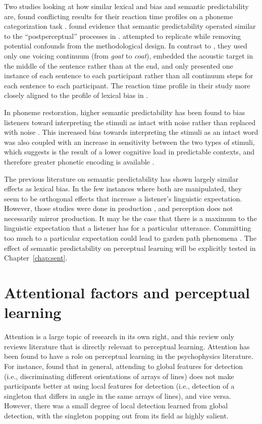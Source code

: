 Two studies looking at how similar lexical and bias and semantic predictability are, found conflicting results for their reaction time profiles on a phoneme categorization task \citep{Connine1987,Borsky1998}.
\citet{Connine1987} found evidence that semantic predictability operated similar to the ``postperceptual'' processes in \citet{Connine1987a}.  
\citet{Borsky1998} attempted to replicate \citet{Connine1987} while removing potential confounds from the methodological design.  
In contrast to \citet{Connine1987}, they used only one voicing continuum (from \emph{goat} to \emph{coat}), embedded the acoustic target in the middle of the sentence rather than at the end, and only presented one instance of each sentence to each participant rather than all continuum steps for each sentence to each participant.  
The reaction time profile in their study more closely aligned to the profile of lexical bias in \citet{Connine1987a}.

In phoneme restoration, higher semantic predictability has been found to bias listeners toward interpreting the stimuli as intact with noise rather than replaced with noise \citep{Samuel1981}.
This increased bias towards interpreting the stimuli as an intact word was also coupled with an increase in sensitivity between the two types of stimuli, which \citet{Samuel1981} suggests is the result of a lower cognitive load in predictable contexts, and therefore greater phonetic encoding is available \citep[see also][]{Mattys2011}.

The previous literature on semantic predictability has shown largely similar effects as lexical bias.  
In the few instances where both are manipulated, they seem to be orthogonal effects that increase a listener's linguistic expectation.  
However, those studies were done in production \citep{Scarborough2010, Clopper2008}, and perception does not necessarily mirror production.  
It may be the case that there is a maximum to the linguistic expectation that a listener has for a particular utterance.  
Committing too much to a particular expectation could lead to garden path phenomena \citep{Levy2008}.  
The effect of semantic predictability on perceptual learning will be explicitly tested in Chapter~\ref{chap:sent}.

\section{Attentional factors and perceptual learning}
\label{sec:attention}

Attention is a large topic of research in its own right, and this review only reviews literature that is directly relevant to perceptual learning.
Attention has been found to have a role on perceptual learning in the psychophysics literature.  
For instance, \citet{Ahissar1993} found that in general, attending to global features for detection (i.e., discriminating different orientations of arrays of lines) does not make participants better at using local features for detection (i.e., detection of a singleton that differs in angle in the same arrays of lines), and vice versa.  However, there was a small degree of local detection learned from global detection, with the singleton popping out from its field as highly salient.

